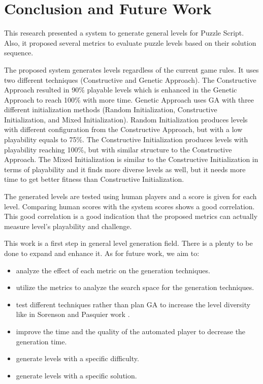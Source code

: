 \documentclass[letterpaper]{article}
\begin{document}
\section{Conclusion and Future Work}
This research presented a system to generate general levels for Puzzle Script. Also, it proposed several metrics to evaluate puzzle levels based on their solution sequence.\\\par

The proposed system generates levels regardless of the current game rules. It uses two different techniques (Constructive and Genetic Approach). The Constructive Approach resulted in 90\% playable levels which is enhanced in the Genetic Approach to reach 100\% with more time. Genetic Approach uses GA with three different initialization methods (Random Initialization, Constructive Initialization, and Mixed Initialization). Random Initialization produces levels with different configuration from the Constructive Approach, but with a low playability equals to 75\%.  The Constructive Initialization produces levels with playability reaching 100\%, but with similar structure to the Constructive Approach. The Mixed Initialization is similar to the Constructive Initialization in terms of playability and it finds more diverse levels as well, but it needs more time to get better fitness than Constructive Initialization.\\\par

The generated levels are tested using human players and a score is given for each level. Comparing human scores with the system scores shows a good correlation. This good correlation is a good indication that the proposed metrics can actually measure level's playability and challenge.\\\par

This work is a first step in general level generation field. There is a plenty to be done to expand and enhance it. As for future work, we aim to:
\begin{itemize}
	\item analyze the effect of each metric on the generation techniques.
	\item utilize the metrics to analyze the search space for the generation techniques.
	\item test different techniques rather than plan GA to increase the level diversity like in Sorenson and Pasquier work \cite{genericLevelFramework}.
	\item improve the time and the quality of the automated player to decrease the generation time.
	\item generate levels with a specific difficulty.
	\item generate levels with a specific solution.
\end{itemize}
\end{document}

